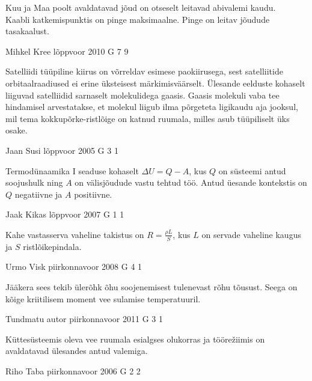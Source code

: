 \documentclass[11pt]{article}
\begin{document}
{{\ifHint
\osa Kuu ja Maa poolt avaldatavad jõud on otseselt leitavad abivalemi kaudu.\\
\osa Kaabli katkemispunktis on pinge maksimaalne. Pinge on leitav jõudude tasakaalust.
\fi
}

{Mihkel Kree} %
{lõppvoor} %
{2010} %
{G 7} %
{9} %
{

\ifHint
Satelliidi tüüpiline kiirus on võrreldav esimese paokiirusega, sest satelliitide orbitaalraadiused ei erine üksteisest märkimisväärselt. Ülesande eelduste kohaselt liiguvad satelliidid sarnaselt molekulidega gaasis. Gaasis molekuli vaba tee hindamisel arvestatakse, et molekul liigub ilma põrgeteta ligikaudu aja jooksul, mil tema kokkupõrke-ristlõige on katnud ruumala, milles asub tüüpiliselt üks osake.
\fi
}

{Jaan Susi} %
{lõppvoor} %
{2005} %
{G 3} %
{1} %
{

\ifHint
Termodünaamika I seaduse kohaselt $\Delta U = Q - A$, kus $Q$ on süsteemi antud soojushulk ning $A$ on välisjõudude vastu tehtud töö. Antud üesande kontekstis on $Q$ negatiivne ja $A$ positiivne.
\fi
}

{Jaak Kikas} %
{lõppvoor} %
{2007} %
{G 1} %
{1} %
{

\ifHint
Kahe vastasserva vaheline takistus on $R = \frac{\rho L}{S}$, kus $L$ on servade vaheline kaugus ja $S$ ristlõikepindala.
\fi
}

{Urmo Visk} %
{piirkonnavoor} %
{2008} %
{G 4} %
{1} %
{

\ifHint
Jääkera sees tekib ülerõhk õhu soojenemisest tulenevast rõhu tõusust. Seega on kõige kriitilisem moment vee sulamise temperatuuril.
\fi
}

{Tundmatu autor} %
{piirkonnavoor} %
{2011} %
{G 3} %
{1} %
{

\ifHint
Küttesüsteemis oleva vee ruumala esialgses olukorras ja töörežiimis on avaldatavad ülesandes antud valemiga.
\fi
}

{Riho Taba} %
{piirkonnavoor} %
{2006} %
{G 2} %
{2} %
{

}}
\end{document}

